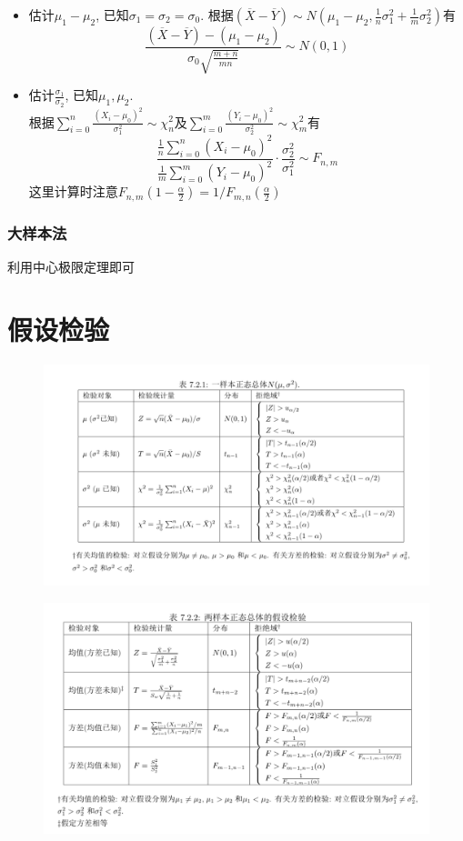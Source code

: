 \documentclass[UTF8]{article}
\begin{document}
\begin{enumerate}
\begin{itemize}
		\item 估计$\mu_1-\mu_2$, 已知$\sigma_1=\sigma_2=\sigma_0$.
		根据$(\overline{X}-\overline{Y}) \sim N(\mu_1-\mu_2, \frac{1}{n}\sigma_1^2+\frac{1}{m}\sigma_2^2)$有
		$$\frac{(\overline{X}-\overline{Y})-(\mu_1-\mu_2)}{\sigma_0\sqrt{\frac{m+n}{mn}}} \sim N(0, 1)$$
						
		\item 估计$\frac{\sigma_1}{\sigma_2}$, 已知$\mu_1, \mu_2$.\\
		根据$\sum\limits_{i=0}^n\frac{(X_i-\mu_0)^2}{\sigma_1^2} \sim \chi_{n}^2$及$\sum\limits_{i=0}^m\frac{(Y_i-\mu_0)^2}{\sigma_2^2} \sim \chi_{m}^2$有
		$$\frac{\frac{1}{n}\sum\limits_{i=0}^n(X_i-\mu_0)^2}{\frac{1}{m}\sum\limits_{i=0}^m(Y_i-\mu_0)^2}\cdot\frac{\sigma_2^2}{\sigma_1^2} \sim F_{n, m}$$
		这里计算时注意$F_{n, m}(1-\frac{\alpha}{2})=1/F_{m, n}(\frac{\alpha}{2})$
		
	\end{itemize}
\end{enumerate}
\subsubsection{大样本法}
利用中心极限定理即可

\section{假设检验}
\begin{figure}[H]
	\centering
	\includegraphics[width=\linewidth]{one_sample_norm.png}
\end{figure}
\begin{figure}[H]
	\centering
	\includegraphics[width=\linewidth]{two_sample_norm.png}
\end{figure}
\end{document}
